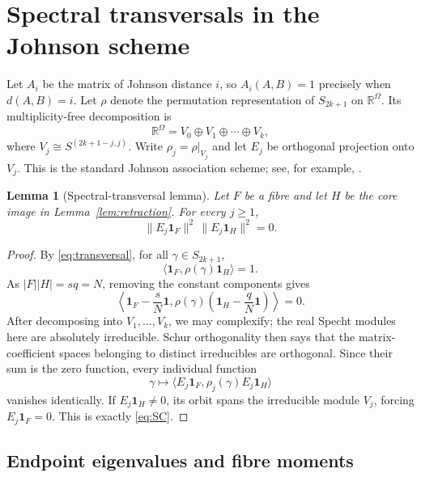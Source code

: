 \documentclass[11pt]{article}
\theoremstyle{plain}
\newtheorem{lemma}[theorem]{Lemma}
\theoremstyle{remark}
\newcommand{\one}{\boldsymbol{1}}
\newcommand{\R}{\mathbb R}
\begin{document}
\section{Spectral transversals in the Johnson scheme}\label{sec:spectral}

Let $A_i$ be the matrix of Johnson distance $i$, so
$A_i(A,B)=1$ precisely when $d(A,B)=i$.  Let $\rho$ denote the permutation
representation of $S_{2k+1}$ on $\R^\Omega$.  Its multiplicity-free
decomposition is
\[
 \R^\Omega=V_0\oplus V_1\oplus\cdots\oplus V_k,
\]
where $V_j\cong S^{(2k+1-j,j)}$.  Write
$\rho_j=\rho|_{V_j}$ and let $E_j$ be orthogonal projection onto $V_j$.
This is the standard Johnson association scheme;
see, for example, \cite{BrouwerCohenNeumaier1989,GodsilNewman2006}.

\begin{lemma}[Spectral-transversal lemma]\label{lem:ST}
Let $F$ be a fibre and let $H$ be the core image in
Lemma~\ref{lem:retraction}.  For every $j\ge1$,
\begin{equation}\label{eq:SC}
 \|E_j\one_F\|^2\,\|E_j\one_H\|^2=0.
\end{equation}
\end{lemma}

\begin{proof}
By \eqref{eq:transversal}, for all $\gamma\in S_{2k+1}$,
\[
 \langle\one_F,\rho(\gamma)\one_H\rangle=1.
\]
As $|F||H|=sq=N$, removing the constant components gives
\[
 \left\langle
 \one_F-\frac{s}{N}\one,
 \rho(\gamma)\left(\one_H-\frac{q}{N}\one\right)
 \right\rangle=0.
\]
After decomposing into $V_1,\ldots,V_k$, we may complexify; the real Specht
modules here are absolutely irreducible.  Schur orthogonality then says that
the matrix-coefficient spaces belonging to distinct irreducibles are
orthogonal.  Since their sum is the zero function, every individual function
\[
 \gamma\longmapsto
 \langle E_j\one_F,\rho_j(\gamma)E_j\one_H\rangle
\]
vanishes identically.  If $E_j\one_H\ne0$, its orbit spans the irreducible
module $V_j$, forcing $E_j\one_F=0$.  This is exactly
\eqref{eq:SC}.
\end{proof}

\subsection{Endpoint eigenvalues and fibre moments}
\end{document}
